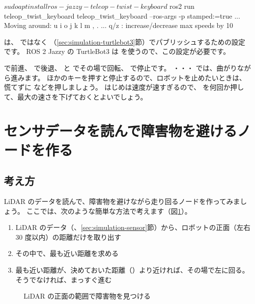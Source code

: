\begin{terminal}
$ sudo apt install ros-jazzy-teleop-twist-keyboard
$ ros2 run teleop_twist_keyboard teleop_twist_keyboard --ros-args -p stamped:=true
...
Moving around:
   u    i    o
   j    k    l
   m    ,    .
...
q/z : increase/decrease max speeds by 10%
\end{terminal}

 は、 ではなく （\ref{sec:simulation-turtlebot3}節）でパブリッシュするための設定です。
ROS 2 Jazzy の TurtleBot3 は  を使うので、この設定が必要です。

 で前進、\key{,} で後退、 と  でその場で回転、 で停止です。
・・・ では、曲がりながら進みます。
ほかのキーを押すと停止するので、ロボットを止めたいときは、慌てずに  などを押しましょう。
はじめは速度が速すぎるので、 を何回か押して、最大の速さを下げておくとよいでしょう。

\section{センサデータを読んで障害物を避けるノードを作る}
\label{sec:practice-avoid}

\subsection{考え方}

LiDAR のデータを読んで、障害物を避けながら走り回るノードを作ってみましょう。
ここでは、次のような簡単な方法で考えます（図\ref{fig:practice-avoid}）。

\begin{enumerate}
  \item LiDAR のデータ（、\ref{sec:simulation-sensor}節）から、ロボットの正面（左右 30 度以内）の距離だけを取り出す
  \item その中で、最も近い距離を求める
  \item 最も近い距離が、決めておいた距離（）より近ければ、その場で左に回る。そうでなければ、まっすぐ進む
\end{enumerate}

\begin{figure}[tb]
  \centering
  
  \caption{LiDAR の正面の範囲で障害物を見つける}
  \label{fig:practice-avoid}
\end{figure}

